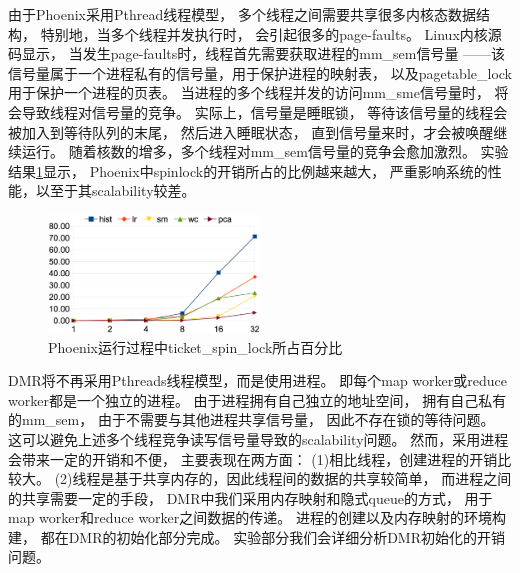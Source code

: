 由于Phoenix采用Pthread线程模型，
多个线程之间需要共享很多内核态数据结构，
特别地，当多个线程并发执行时，
会引起很多的page-faults。
Linux内核源码显示，
当发生page-faults时，线程首先需要获取进程的mm\_sem信号量
——该信号量属于一个进程私有的信号量，用于保护进程的映射表，
以及pagetable\_lock用于保护一个进程的页表。
当进程的多个线程并发的访问mm\_sme信号量时，
将会导致线程对信号量的竞争。
实际上，信号量是睡眠锁，
等待该信号量的线程会被加入到等待队列的末尾，
然后进入睡眠状态，
直到信号量来时，才会被唤醒继续运行。
随着核数的增多，多个线程对mm\_sem信号量的竞争会愈加激烈。
实验结果\ref{phoenix:spinlock}显示，
Phoenix中spinlock的开销所占的比例越来越大，
严重影响系统的性能，以至于其scalability较差。
\begin{figure}[!h!t]  
    \centering
    \includegraphics[width=0.5\textwidth]{img/phoenix_spinlock.eps}
    \caption{Phoenix运行过程中ticket\_spin\_lock所占百分比}
    \label{phoenix:spinlock}
\end{figure}

DMR将不再采用Pthreads线程模型，而是使用进程。
即每个map worker或reduce worker都是一个独立的进程。
由于进程拥有自己独立的地址空间，
拥有自己私有的mm\_sem，
由于不需要与其他进程共享信号量，
因此不存在锁的等待问题。
这可以避免上述多个线程竞争读写信号量导致的scalability问题。
然而，采用进程会带来一定的开销和不便，
主要表现在两方面：
(1)相比线程，创建进程的开销比较大。
(2)线程是基于共享内存的，因此线程间的数据的共享较简单，
而进程之间的共享需要一定的手段，
DMR中我们采用内存映射和隐式queue的方式，
用于map worker和reduce worker之间数据的传递。
进程的创建以及内存映射的环境构建，
都在DMR的初始化部分完成。
实验部分我们会详细分析DMR初始化的开销问题。
